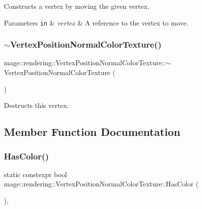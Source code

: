Constructs a vertex by moving the given vertex.


\begin{DoxyParams}[1]{Parameters}
\mbox{\tt in}  & {\em vertex} & A reference to the vertex to move. \\
\hline
\end{DoxyParams}
\hypertarget{structmage_1_1rendering_1_1_vertex_position_normal_color_texture_ac209c1c9239db1545c0c9920d6560b1d}{}\label{structmage_1_1rendering_1_1_vertex_position_normal_color_texture_ac209c1c9239db1545c0c9920d6560b1d} 
\subsubsection{\texorpdfstring{$\sim$\+Vertex\+Position\+Normal\+Color\+Texture()}{~VertexPositionNormalColorTexture()}}
{\footnotesize\ttfamily mage\+::rendering\+::\+Vertex\+Position\+Normal\+Color\+Texture\+::$\sim$\+Vertex\+Position\+Normal\+Color\+Texture (\begin{DoxyParamCaption}{ }\end{DoxyParamCaption})\hspace{0.3cm}{\ttfamily [default]}}

Destructs this vertex. 

\subsection{Member Function Documentation}
\hypertarget{structmage_1_1rendering_1_1_vertex_position_normal_color_texture_a1688dd4509c6766bea6fc15a4bcb348d}{}\label{structmage_1_1rendering_1_1_vertex_position_normal_color_texture_a1688dd4509c6766bea6fc15a4bcb348d} 
\subsubsection{\texorpdfstring{Has\+Color()}{HasColor()}}
{\footnotesize\ttfamily static constexpr bool mage\+::rendering\+::\+Vertex\+Position\+Normal\+Color\+Texture\+::\+Has\+Color (\begin{DoxyParamCaption}{ }\end{DoxyParamCaption})\hspace{0.3cm}{\ttfamily [static]}, {\ttfamily [noexcept]}}

